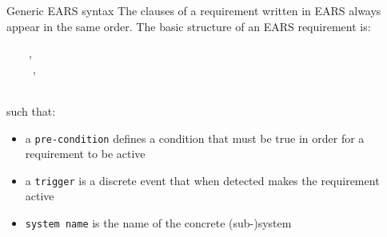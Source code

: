 \documentclass[aspectratio=169]{beamer}
\begin{document}
\begin{slide}{Generic EARS syntax}
    The clauses of a requirement written in EARS always appear in the same order. The basic structure of an EARS requirement is:

    \begin{block}{}\ttfamily
    ~~~~, \\
    ~~~~ , \\
    ~~~~   
    \end{block}

    such that:
    \begin{itemize}
      \item a {\tt pre-condition} defines a condition that must be true in order for a requirement to be active
      \item a {\tt trigger} is a discrete event that when detected makes the requirement active
      \item {\tt system name} is the name of the concrete (sub{-})system 
    \end{itemize}

\end{slide}

\end{document}
